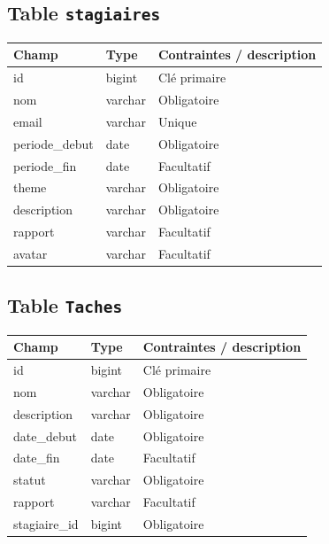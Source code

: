 \documentclass[11pt,a4paper]{report}
\begin{document}
\subsection*{Table \texttt{stagiaires}}
\begin{center}
\renewcommand{\arraystretch}{1.2}
\begin{tabular}{L{2.6cm} L{2.6cm} L{7.8cm}}
\toprule
{}
\textbf{Champ} & \textbf{Type} & \textbf{Contraintes / description} \\
\midrule
id & bigint & Clé primaire \\
nom & varchar & Obligatoire \\
email & varchar & Unique \\
periode\_debut & date & Obligatoire \\
periode\_fin & date & Facultatif \\
theme & varchar & Obligatoire \\
description & varchar & Obligatoire \\
rapport & varchar & Facultatif \\
avatar & varchar & Facultatif \\
\bottomrule
\end{tabular}
\end{center}

\subsection*{Table \texttt{Taches}}
\begin{center}
\renewcommand{\arraystretch}{1.2}
\begin{tabular}{L{2.6cm} L{2.6cm} L{7.8cm}}
\toprule
{}
\textbf{Champ} & \textbf{Type} & \textbf{Contraintes / description} \\
\midrule
id & bigint & Clé primaire \\
nom & varchar & Obligatoire \\
description & varchar & Obligatoire \\
date\_debut & date & Obligatoire \\
date\_fin & date & Facultatif \\
statut & varchar & Obligatoire \\
rapport & varchar & Facultatif \\
stagiaire\_id & bigint & Obligatoire \\
\bottomrule
\end{tabular}
\end{center}
\end{document}
